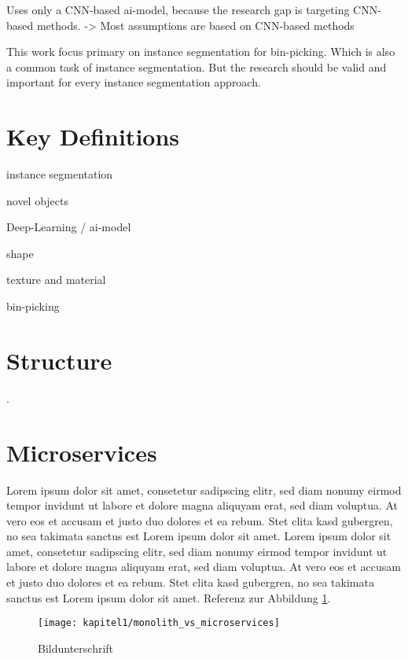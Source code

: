 		Uses only a CNN-based ai-model, because the research gap is targeting CNN-based methods. -> Most assumptions are based on CNN-based methods
	
		This work focus primary on instance segmentation for bin-picking. Which is also a common task of instance segmentation\cite{Raj2023}\cite{Danielczuk2019}\cite{Xie2021}. But the research should be valid and important for every instance segmentation approach.
	
	
	
	\section{Key Definitions}
	\label{sec:key-definitions}
	
	instance segmentation
	
	novel objects
	
	Deep-Learning / ai-model
	
	shape
	
	texture and material
	
	bin-picking
	
	
	
	\section{Structure}
	\label{sec:structure}






 \cite{Fowler2014}.

	\section{Microservices}
	\label{sec:microservices}
	Lorem ipsum dolor sit amet, consetetur sadipscing elitr, sed diam nonumy eirmod tempor invidunt ut labore et dolore magna aliquyam erat, sed diam voluptua. At vero eos et accusam et justo duo dolores et ea rebum. Stet clita kasd gubergren, no sea takimata sanctus est Lorem ipsum dolor sit amet. Lorem ipsum dolor sit amet, consetetur sadipscing elitr, sed diam nonumy eirmod tempor invidunt ut labore et dolore magna aliquyam erat, sed diam voluptua. At vero eos et accusam et justo duo dolores et ea rebum. Stet clita kasd gubergren, no sea takimata sanctus est Lorem ipsum dolor sit amet. Referenz zur Abbildung \ref{img:microprofile}.
	\begin{figure}[h]
		\centering
		\texttt{[image: kapitel1/monolith\_vs\_microservices]}
		\caption[Beschreibung für Verzeichnis]{Bildunterschrift}
		\label{img:microprofile}
	\end{figure}
	
